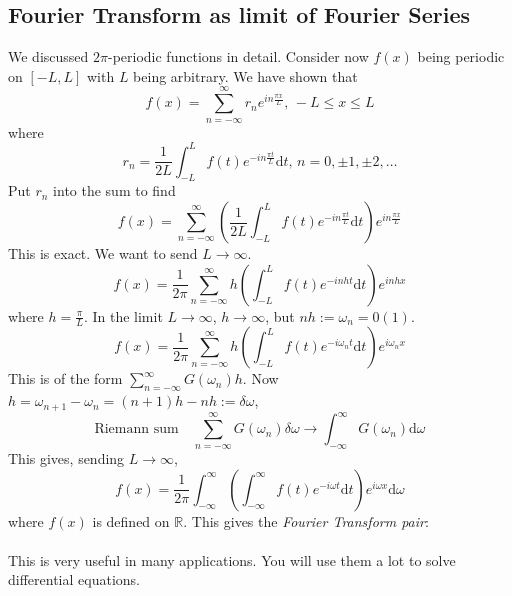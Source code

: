 \documentclass[12pt]{report}
\theoremstyle{definition}
\begin{document}
\subsection{Fourier Transform as limit of Fourier Series}
We discussed $2\pi$-periodic functions in detail. 
Consider now $f(x)$ being periodic on $[-L, L]$ with $L$ being arbitrary.
We have shown that \[
    f(x) = \sum_{n=-\infty}^{\infty} r_n e^{in \frac{\pi x}{L}}, \, -L \le x \le L
\]where\[
r_n = \frac{1}{2L}\int_{-L}^{L} f(t) e^{-in \frac{\pi t}{L}} \mathrm{d}t, \, n = 0, \pm 1, \pm 2, \ldots
\]
Put $r_n$ into the sum to find\[
    f(x) = \sum_{n=-\infty}^{\infty} \left(\frac{1}{2L} 
    \int_{-L}^{L} f(t) e^{-in \frac{\pi t}{L}} \mathrm{d}t\right) e^{in \frac{\pi x}{L}}
\]
This is exact. We want to send $L \rightarrow \infty$.\[
    f(x) = \frac{1}{2\pi}\sum_{n=-\infty}^{\infty} h\left(
    \int_{-L}^{L} f(t)e^{-inht} \mathrm{d}t\right) e^{inhx}
\]
where $h = \frac{\pi}{L}$.
In the limit $L \rightarrow \infty$, $h \rightarrow \infty$, 
but $nh := \omega_n = 0(1)$.\[
    f(x) = \frac{1}{2\pi} \sum_{n=-\infty}^{\infty} h\left(
    \int_{-L}^{L} f(t)e^{-i\omega_n t} \mathrm{d}t\right)e^{i\omega_n x}
\]
This is of the form $\sum_{n=-\infty}^{\infty} G(\omega_n)h$.
Now $h = \omega_{n+1} - \omega_n = (n + 1)h - nh := \delta\omega$,\[
    \text{Riemann sum} \quad \sum_{n=-\infty}^{\infty} G(\omega_n)\delta\omega 
    \rightarrow \int_{-\infty}^{\infty} G(\omega_n)\mathrm{d}\omega
\]
This gives, sending $L \rightarrow \infty$, \[
    f(x) = \frac{1}{2\pi}\int_{-\infty}^{\infty} \left(\int_{-\infty}^{\infty} 
    f(t) e^{-i\omega t}\mathrm{d}t\right) e^{i\omega x} \mathrm{d}\omega
\]where $f(x)$ is defined on $\mathbb{R}$.
This gives the \emph{Fourier Transform pair}:
\medskip
\\\fbox{\begin{minipage}{\linewidth}
\[
    f(x) = \frac{1}{2\pi}\int_{-\infty}^{\infty} \hat{f}(k) e^{ikx}\mathrm{d}k
\]\[
\hat{f}(x) = \int_{-\infty}^{\infty} f(x) e^{-ikx}\mathrm{d}x
\]
\end{minipage}}
\medskip
\\This is very useful in many applications. You will use them a lot to solve differential equations.
\end{document}
